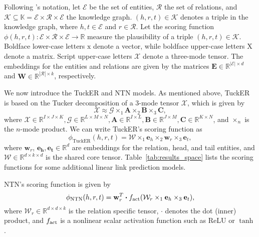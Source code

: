 \documentclass[11pt]{article}
\newcommand{\bigcdot}{\boldsymbol{\cdot}}
\begin{document}
Following \cite{balavzevic2019tucker}'s notation, let $\mathcal{E}$ be the set of entities, $\mathcal{R}$ the set of relations, and $\mathcal{K} \subseteq \mathbb{K} = \mathcal{E} \times \mathcal{R} \times \mathcal{E}$ the knowledge graph. $(h, r, t) \in \mathcal{K}$ denotes a triple in the knowledge graph, where $h, t \in \mathcal{E}$ and $r \in \mathcal{R}$. Let the scoring function $\phi(h, r, t) : \mathcal{E} \times \mathcal{R} \times \mathcal{E} \rightarrow \mathbb{R}$ measure the plausibility of a triple $(h, r, t) \in \mathcal{K}$. Boldface lower-case letters $\boldsymbol{\mathrm{x}}$ denote a vector, while boldface upper-case letters $\boldsymbol{\mathrm{X}}$ denote a matrix. Script upper-case letters $\mathrm{\mathcal{X}}$ denote a three-mode tensor. The embeddings for the entities and relations are given by the matrices $\mathbf{E} \in \mathbb{R}^{|\mathcal{E}| \times d}$ and $\mathbf{W} \in \mathbb{R}^{|\mathcal{R}| \times k}$, respectively.

We now introduce the TuckER and NTN models. 
As mentioned above, TuckER is based on the Tucker decomposition of a 3-mode tensor $\mathcal{X}$, which is given by
\begin{equation}
    \mathcal{X} \approx \mathcal{G} \times_1 \mathbf{A} \times_2 \mathbf{B} \times_3 \mathbf{C},
    \label{eq:decompose}
\end{equation}
where $\mathcal{X} \in \mathbb{R}^{I \times J \times K}, \mathcal{G} \in \mathbb{R}^{L \times M \times N}, \mathbf{A} \in \mathbb{R}^{I \times L}, \mathbf{B} \in \mathbb{R}^{J \times M}, \mathbf{C} \in \mathbb{R}^{K \times N}$, and $\times_n$ is the $n$-mode product. 
We can write TuckER's scoring function as
\begin{equation}
    \phi_{\text{TuckER}}(h, r, t) = \mathrm{\mathcal{W}} \times_1 \mathbf{e}_h \times_2 \mathbf{w}_r \times_3 \mathbf{e}_t,
    \label{eq:tucker_eq}
\end{equation}
where $\mathbf{w}_r$, $\mathbf{e_h, e_t} \in \mathbb{R}^d$ are embeddings for the relation, head, and tail entities, and $\mathrm{\mathcal{W}} \in \mathbb{R}^{d \times k \times d}$ is the shared core tensor. Table~\ref{tab:results_space} lists the scoring functions for some additional linear link prediction models.

NTN's scoring function is given by
\begin{equation}
    \phi_{\text{NTN}}(h, r, t) = \boldsymbol{\mathrm{w}}_r^T \bigcdot f_{\rm act}(\mathrm{\mathcal{W}}_r \times_1 \mathbf{e}_h \times_3 \mathbf{e}_t),
    \label{eq:ntn_eq}
\end{equation}
where $\mathcal{W}_r \in \mathbb{R}^{d \times d \times k}$ is the relation specific tensor, $\bigcdot$ denotes the dot (inner) product, and $f_{\rm act}$ is a nonlinear scalar activation function such as ReLU or $\tanh$.
\end{document}
